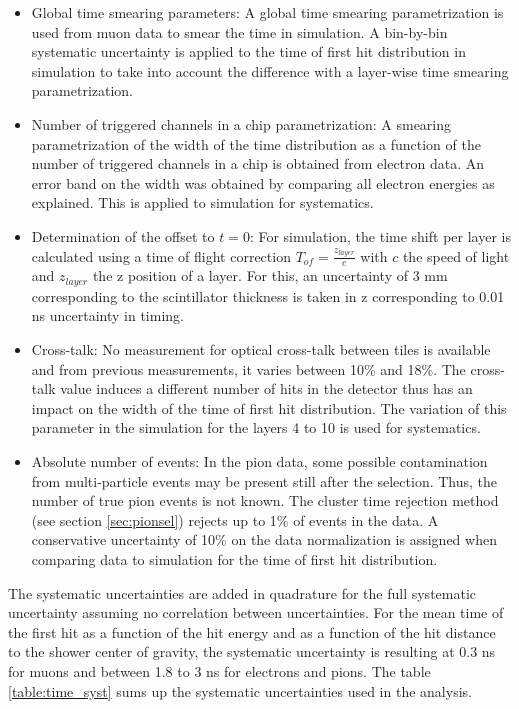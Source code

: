 \documentclass{JINST}
\begin{document}
\begin{itemize}
  \item Global time smearing parameters: A global time smearing parametrization is used from muon data to smear the time in simulation. A bin-by-bin systematic uncertainty is applied to the time of first hit distribution in simulation to take into account the difference with a layer-wise time smearing parametrization.
  \item Number of triggered channels in a chip parametrization: A smearing parametrization of the width of the time distribution as a function of the number of triggered channels in a chip is obtained from electron data. An error band on the width was obtained by comparing all electron energies as explained. This is applied to simulation for systematics.
  \item Determination of the offset to $t=0$: For simulation, the time shift per layer is calculated using a time of flight correction $T_{of} = \frac{z_{layer}}{c}$ with $c$ the speed of light and $z_{layer}$ the z position of a layer. For this, an uncertainty of 3 mm corresponding to the scintillator thickness is taken in z corresponding to 0.01 ns uncertainty in timing.
  \item Cross-talk: No measurement for optical cross-talk between tiles is available and from previous measurements, it varies between 10\% and 18\%. The cross-talk value induces a different number of hits in the detector thus has an impact on the width of the time of first hit distribution. The variation of this parameter in the simulation for the layers 4 to 10 is used for systematics.
  \item Absolute number of events: In the pion data, some possible contamination from multi-particle events may be present still after the selection. Thus, the number of true pion events is not known. The cluster time rejection method (see section \ref{sec:pionsel}) rejects up to 1\% of events in the data. A conservative uncertainty of 10\% on the data normalization is assigned when comparing data to simulation for the time of first hit distribution.
\end{itemize}

The systematic uncertainties are added in quadrature for the full systematic uncertainty assuming no correlation between uncertainties. For the mean time of the first hit as a function of the hit energy and as a function of the hit distance to the shower center of gravity, the systematic uncertainty is resulting at 0.3 ns for muons and between 1.8 to 3 ns for electrons and pions. The table \ref{table:time_syst} sums up the systematic uncertainties used in the analysis.
\end{document}
